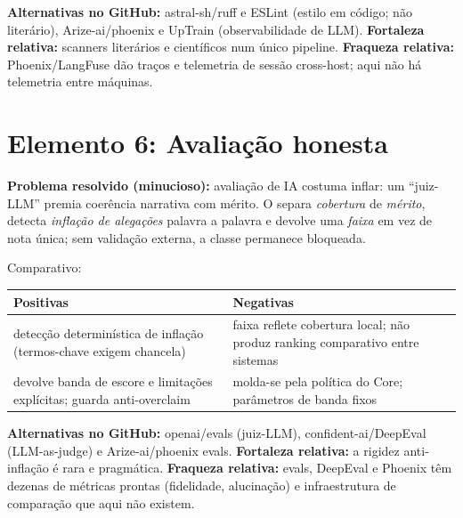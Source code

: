 \begin{metodo}
\textbf{Alternativas no GitHub:} astral-sh/ruff e ESLint (estilo em código; não
literário), Arize-ai/phoenix e UpTrain (observabilidade de LLM).
\textbf{Fortaleza relativa:} scanners literários e científicos num único
pipeline. \textbf{Fraqueza relativa:} Phoenix/LangFuse dão traços e telemetria
de sessão cross-host; aqui não há telemetria entre máquinas.
\end{metodo}

\clearpage
\section{Elemento 6: Avaliação honesta}


\begin{funcao}
\textbf{Problema resolvido (minucioso):} avaliação de IA costuma inflar: um
``juiz-LLM'' premia coerência narrativa com mérito. O 
separa \emph{cobertura} de \emph{mérito}, detecta \emph{inflação de alegações}
palavra a palavra e devolve uma \emph{faixa} em vez de nota única; sem validação
externa, a classe  permanece bloqueada.
\end{funcao}

\begin{resultado}
Comparativo:\par
\smallskip
{\footnotesize
\begin{tabularx}{\linewidth}{YY}
\toprule
Positivas & Negativas \\
\midrule
detecção determinística de inflação (termos-chave exigem chancela) &
faixa reflete cobertura local; não produz ranking comparativo entre sistemas \\
devolve banda de escore e limitações explícitas; guarda anti-overclaim &
molda-se pela política do Core; parâmetros de banda fixos \\
\bottomrule
\end{tabularx}\par}
\end{resultado}

\begin{metodo}
\textbf{Alternativas no GitHub:} openai/evals (juiz-LLM), confident-ai/DeepEval
(LLM-as-judge) e Arize-ai/phoenix evals. \textbf{Fortaleza relativa:} a rigidez
anti-inflação é rara e pragmática. \textbf{Fraqueza relativa:} evals, DeepEval
e Phoenix têm dezenas de métricas prontas (fidelidade, alucinação) e
infraestrutura de comparação que aqui não existem.
\end{metodo}

